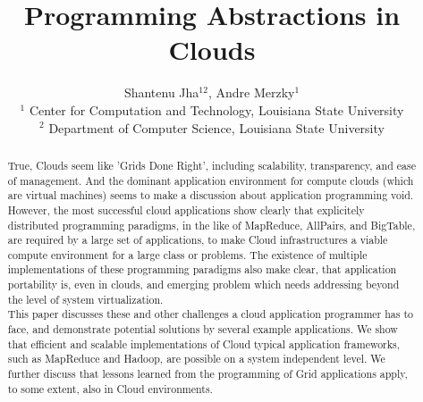 \documentclass{article}
\begin{document}
\title{\large Programming Abstractions in Clouds}

\author{Shantenu Jha$^{12}$,
        Andre Merzky$^1$\\[1em]
        $^1$\small
          Center for Computation and Technology, 
          Louisiana State University\\
        $^2$ \small
          Department of Computer Science, 
          Louisiana State University
       }

\maketitle

\begin{abstract}

  \noindent
  True, Clouds seem like 'Grids Done Right', including scalability,
  transparency, and ease of management.  And the dominant application
  environment for compute clouds (which are virtual machines) seems to
  make a discussion about application programming void.  However, the
  most successful cloud applications show clearly that explicitely
  distributed programming paradigms, in the like of MapReduce,
  AllPairs, and BigTable, are required by a large set of applications,
  to make Cloud infrastructures a viable compute environment for a
  large class or problems.  The existence of multiple implementations
  of these programming paradigms also make clear, that application
  portability is, even in clouds, and emerging problem which needs
  addressing beyond the level of system virtualization.\\[-0.5em]

  \noindent
  This paper discusses these and other challenges a cloud application
  programmer has to face, and demonstrate potential solutions by
  several example applications.  We show that efficient and scalable
  implementations of Cloud typical application frameworks, such as
  MapReduce and Hadoop, are possible on a system independent level.
  We further discuss that lessons learned from the programming of Grid
  applications apply, to some extent, also in Cloud environments.

\end{abstract}

\end{document}
